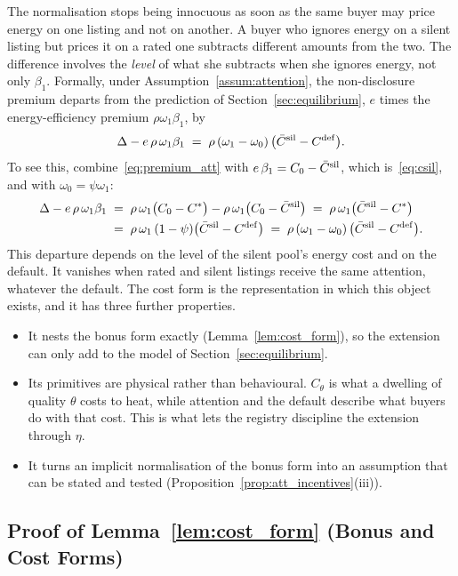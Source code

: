 The normalisation stops being innocuous as soon as the same buyer may price energy on one listing and not on another. A buyer who ignores energy on a silent listing but prices it on a rated one subtracts different amounts from the two. The difference involves the \emph{level} of what she subtracts when she ignores energy, not only $\beta_1$. Formally, under Assumption~\ref{assum:attention}, the non-disclosure premium departs from the prediction of Section~\ref{sec:equilibrium}, $e$ times the energy-efficiency premium $\rho\omega_1\beta_1$, by
\begin{equation*}
    \Delta-e\,\rho\,\omega_1\beta_1\;=\;\rho\,(\omega_1-\omega_0)\,\big(\bar C^{\rm sil}-C^{\rm def}\big).
\end{equation*}
To see this, combine~\eqref{eq:premium_att} with $e\,\beta_1=C_0-\bar C^{\rm sil}$, which is~\eqref{eq:csil}, and with $\omega_0=\psi\omega_1$:
\begin{align*}
    \Delta-e\,\rho\,\omega_1\beta_1
    &\;=\;\rho\,\omega_1\big(C_0-C^*\big)-\rho\,\omega_1\big(C_0-\bar C^{\rm sil}\big)
    \;=\;\rho\,\omega_1\big(\bar C^{\rm sil}-C^*\big)\\
    &\;=\;\rho\,\omega_1\,(1-\psi)\big(\bar C^{\rm sil}-C^{\rm def}\big)
    \;=\;\rho\,(\omega_1-\omega_0)\,\big(\bar C^{\rm sil}-C^{\rm def}\big).
\end{align*}
This departure depends on the level of the silent pool's energy cost and on the default. It vanishes when rated and silent listings receive the same attention, whatever the default. The cost form is the representation in which this object exists, and it has three further properties.
\begin{itemize}
    \item It nests the bonus form exactly (Lemma~\ref{lem:cost_form}), so the extension can only add to the model of Section~\ref{sec:equilibrium}.
    \item Its primitives are physical rather than behavioural. $C_\theta$ is what a dwelling of quality $\theta$ costs to heat, while attention and the default describe what buyers do with that cost. This is what lets the registry discipline the extension through $\eta$.
    \item It turns an implicit normalisation of the bonus form into an assumption that can be stated and tested (Proposition~\ref{prop:att_incentives}(iii)).
\end{itemize}

\subsection*{Proof of Lemma~\ref{lem:cost_form} (Bonus and Cost Forms)}

